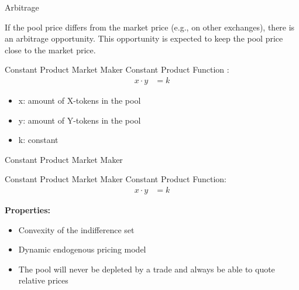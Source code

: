 \documentclass[]{beamer}
\begin{document}
\begin{frame}{Arbitrage}
	\begin{figure}
		
	\end{figure}
		
		If the pool price differs from the market price (e.g., on other exchanges), there is an arbitrage opportunity. This opportunity is expected to keep the pool price close to the market price.
\end{frame}


\begin{frame}{Constant Product Market Maker}
Constant Product Function \cite{UNIV2}:
	\begin{align*}
		x \cdot y &= k
	\end{align*}

	\begin{itemize}
		\item[] x: amount of X-tokens in the pool
		\item[] y: amount of Y-tokens in the pool
		\item[] k: constant
	\end{itemize}
	\vspace{1cm}
\end{frame}


\begin{frame}{Constant Product Market Maker}
	\begin{figure}[h!]
		\begin{center}
			
		\end{center}
	\end{figure}
\end{frame}


\begin{frame}{Constant Product Market Maker}
Constant Product Function:
	\begin{align*}
		x \cdot y &= k
	\end{align*}
	
	\textbf{Properties:}
	\begin{itemize}
		\item<1-> Convexity of the indifference set
		\item<2-> Dynamic endogenous pricing model
		\item<3-> The pool will never be depleted by a trade and always be able to quote relative prices
	\end{itemize}
\end{frame}
\end{document}
